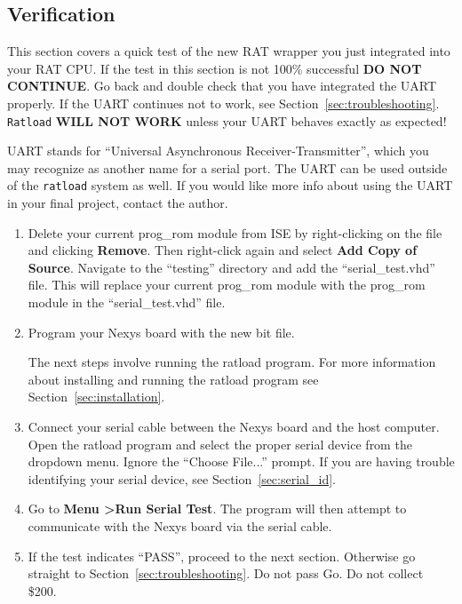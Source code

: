 \documentclass[notitlepage]{article}
\newcommand{\infosign}{\fontencoding{U}\fontfamily{futs}\huge\selectfont\char 116\relax}
\begin{document}
\subsection{Verification}
\label{sec:verification}
This section covers a quick test of the new RAT wrapper you just integrated into your RAT CPU. If the test in this section is not 100\% successful \textbf{DO NOT CONTINUE}. Go back and double check that you have integrated the UART properly. If the UART continues not to work, see Section~\ref{sec:troubleshooting}. \texttt{Ratload} \textbf{WILL NOT WORK} unless your UART behaves exactly as expected!

\begin{infobox}
  {\infosign} UART stands for ``Universal Asynchronous Receiver-Transmitter'', which you may recognize as another name for a serial port. The UART can be used outside of the \texttt{ratload} system as well. If you would like more info about using the UART in your final project, contact the author.
\end{infobox}

\begin{enumerate}
\item Delete your current prog\_rom module from ISE by right-clicking on the file and clicking \textbf{Remove}. Then right-click again and select \textbf{Add Copy of Source}. Navigate to the ``testing'' directory and add the ``serial\_test.vhd'' file. This will replace your current prog\_rom module with the prog\_rom module in the ``serial\_test.vhd'' file.

\item Program your Nexys board with the new bit file.

\begin{infobox}
  {\infosign} The next steps involve running the ratload program. For more information about installing and running the ratload program see Section~\ref{sec:installation}.
\end{infobox}

\item Connect your serial cable between the Nexys board and the host computer. Open the ratload program and select the proper serial device from the dropdown menu. Ignore the ``Choose File...'' prompt. If you are having trouble identifying your serial device, see Section~\ref{sec:serial_id}.

\item Go to \textbf{Menu \textgreater Run Serial Test}. The program will then attempt to communicate with the Nexys board via the serial cable.

\item If the test indicates ``PASS'', proceed to the next section. Otherwise go straight to Section~\ref{sec:troubleshooting}. Do not pass Go. Do not collect \$200.
\end{enumerate}
\end{document}
